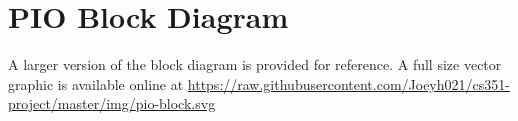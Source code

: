 \chapter{PIO Block Diagram}
\label{ch:bd}

A larger version of the block diagram is provided for reference. A full size vector graphic is available online at \url{https://raw.githubusercontent.com/Joeyh021/cs351-project/master/img/pio-block.svg}

